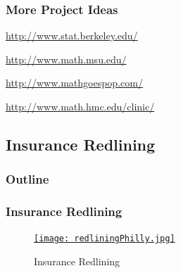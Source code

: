 \begin{frame}[fragile]
    \frametitle{More Project Ideas}
    \begin{center}
    \href{http://www.stat.berkeley.edu/users/statlabs/}{http://www.stat.berkeley.edu/}
    \end{center}
    \vskip0.25in
    \begin{center}
        \href{http://www.math.msu.edu/Academic%5FPrograms/graduate/msim//ProjectPage.aspx}{http://www.math.msu.edu/}
    \end{center}
    \vskip0.25in
    \begin{center}
        \href{http://www.mathgoespop.com/2011/09/moneyball.html}{http://www.mathgoespop.com/}
    \end{center}
    \vskip0.25in
    \begin{center}
        \href{http://www.math.hmc.edu/clinic/projects/years/}{http://www.math.hmc.edu/clinic/}
    \end{center}
\end{frame}

\subsection{Insurance Redlining}

\begin{frame}
    \frametitle{Outline}
\end{frame}

\newtheorem{DEFinsredlining}{Insurance Redlining}
\newtheorem{DEFfairplan}{FAIR}

\begin{frame}
    \frametitle{ Insurance Redlining}
    \begin{figure}
        \centering
        \caption{Insurance Redlining}
        \href{http://en.wikipedia.org/wiki/Redlining}{
        \texttt{[image: redliningPhilly.jpg]}
        }
                \label{fig:redlining}
    \end{figure}
\end{frame}



